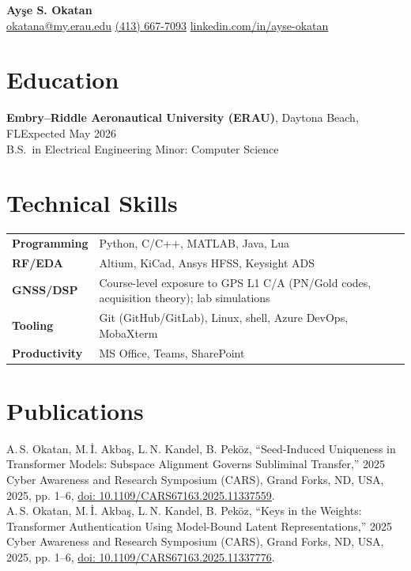\documentclass[10pt]{article}
\newcommand{\place}[2]{#1\hfill #2}
\newcommand{\sep}{\;\textbar\;}
\begin{document}
\begin{center}
  {\LARGE \textbf{Ayşe S. Okatan}}\\[4pt]
  \href{mailto:okatana@my.erau.edu}{okatana@my.erau.edu} \sep
  \href{tel:+14136677093}{(413) 667-7093} \sep
  \href{https://www.linkedin.com/in/ayse-okatan}{linkedin.com/in/ayse-okatan}
\end{center}
\vspace{2pt}

\section*{Education}
\place{\textbf{Embry–Riddle Aeronautical University (ERAU)}, Daytona Beach, FL}{Expected May 2026}\\
B.S.\ in Electrical Engineering \hfill Minor: Computer Science

\section*{Technical Skills}
\begin{tabularx}{\linewidth}{@{}>{\bfseries}l Y@{}}
  Programming & Python, C/C++, MATLAB, Java, Lua \\
  RF/EDA & Altium, KiCad, Ansys HFSS, Keysight ADS \\
  GNSS/DSP & Course-level exposure to GPS L1 C/A (PN/Gold codes, acquisition theory); lab simulations \\
  Tooling & Git (GitHub/GitLab), Linux, shell, Azure DevOps, MobaXterm \\
  Productivity & MS Office, Teams, SharePoint \\
\end{tabularx}

\section*{Publications}
A.\,S. Okatan, M.\,İ. Akbaş, L.\,N. Kandel, B. Peköz, ``Seed-Induced Uniqueness in Transformer Models: Subspace Alignment Governs Subliminal Transfer,'' 2025 Cyber Awareness and Research Symposium (CARS), Grand Forks, ND, USA, 2025, pp. 1--6, \href{https://doi.org/10.1109/CARS67163.2025.11337559}{doi: 10.1109/CARS67163.2025.11337559}.\\
A.\,S. Okatan, M.\,İ. Akbaş, L.\,N. Kandel, B. Peköz, ``Keys in the Weights: Transformer Authentication Using Model-Bound Latent Representations,'' 2025 Cyber Awareness and Research Symposium (CARS), Grand Forks, ND, USA, 2025, pp. 1--6, \href{https://doi.org/10.1109/CARS67163.2025.11337776}{doi: 10.1109/CARS67163.2025.11337776}.
\end{document}
